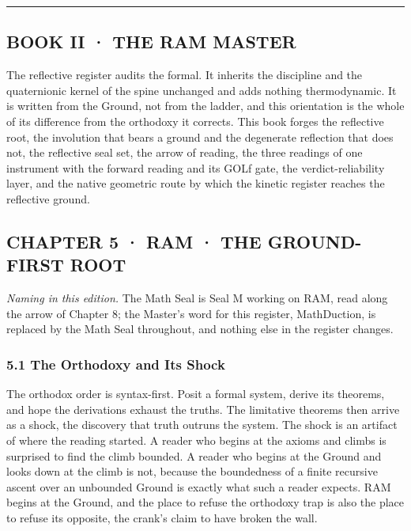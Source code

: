 \documentclass[10pt,twocolumn]{article}
\begin{document}
\begin{center}\rule{0.5\linewidth}{0.5pt}\end{center}

\hypertarget{book-ii-the-ram-master}{%
\subsection{BOOK II · THE RAM MASTER}\label{book-ii-the-ram-master}}

The reflective register audits the formal. It inherits the discipline
and the quaternionic kernel of the spine unchanged and adds nothing
thermodynamic. It is written from the Ground, not from the ladder, and
this orientation is the whole of its difference from the orthodoxy it
corrects. This book forges the reflective root, the involution that
bears a ground and the degenerate reflection that does not, the
reflective seal set, the arrow of reading, the three readings of one
instrument with the forward reading and its GOLf gate, the
verdict-reliability layer, and the native geometric route by which the
kinetic register reaches the reflective ground.

\hypertarget{chapter-5-ram-the-ground-first-root}{%
\subsection{CHAPTER 5 · RAM · THE GROUND-FIRST
ROOT}\label{chapter-5-ram-the-ground-first-root}}

\emph{Naming in this edition.} The Math Seal is Seal M working on RAM,
read along the arrow of Chapter 8; the Master's word for this register,
MathDuction, is replaced by the Math Seal throughout, and nothing else
in the register changes.

\hypertarget{the-orthodoxy-and-its-shock}{%
\subsubsection{5.1 The Orthodoxy and Its
Shock}\label{the-orthodoxy-and-its-shock}}

The orthodox order is syntax-first. Posit a formal system, derive its
theorems, and hope the derivations exhaust the truths. The limitative
theorems then arrive as a shock, the discovery that truth outruns the
system. The shock is an artifact of where the reading started. A reader
who begins at the axioms and climbs is surprised to find the climb
bounded. A reader who begins at the Ground and looks down at the climb
is not, because the boundedness of a finite recursive ascent over an
unbounded Ground is exactly what such a reader expects. RAM begins at
the Ground, and the place to refuse the orthodoxy trap is also the place
to refuse its opposite, the crank's claim to have broken the wall.
\end{document}
